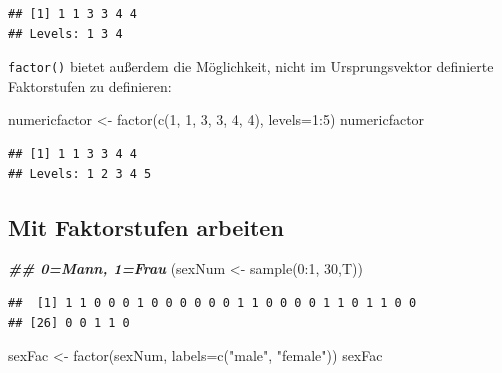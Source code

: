 \documentclass[
]{book}
\newenvironment{Shaded}{\begin{snugshade}}{\end{snugshade}}
\newcommand{\AttributeTok}[1]{\textcolor[rgb]{0.77,0.63,0.00}{#1}}
\newcommand{\DecValTok}[1]{\textcolor[rgb]{0.00,0.00,0.81}{#1}}
\newcommand{\DocumentationTok}[1]{\textcolor[rgb]{0.56,0.35,0.01}{\textbf{\textit{#1}}}}
\newcommand{\FunctionTok}[1]{\textcolor[rgb]{0.00,0.00,0.00}{#1}}
\newcommand{\NormalTok}[1]{#1}
\newcommand{\OtherTok}[1]{\textcolor[rgb]{0.56,0.35,0.01}{#1}}
\newcommand{\SpecialCharTok}[1]{\textcolor[rgb]{0.00,0.00,0.00}{#1}}
\newcommand{\StringTok}[1]{\textcolor[rgb]{0.31,0.60,0.02}{#1}}
\begin{document}
\begin{verbatim}
## [1] 1 1 3 3 4 4
## Levels: 1 3 4
\end{verbatim}

\texttt{factor()} bietet außerdem die Möglichkeit, nicht im Ursprungsvektor definierte Faktorstufen zu definieren:

\begin{Shaded}
\begin{Highlighting}[]
\NormalTok{numericfactor }\OtherTok{\textless{}{-}} \FunctionTok{factor}\NormalTok{(}\FunctionTok{c}\NormalTok{(}\DecValTok{1}\NormalTok{, }\DecValTok{1}\NormalTok{, }\DecValTok{3}\NormalTok{, }\DecValTok{3}\NormalTok{, }\DecValTok{4}\NormalTok{, }\DecValTok{4}\NormalTok{), }\AttributeTok{levels=}\DecValTok{1}\SpecialCharTok{:}\DecValTok{5}\NormalTok{)}
\NormalTok{numericfactor}
\end{Highlighting}
\end{Shaded}

\begin{verbatim}
## [1] 1 1 3 3 4 4
## Levels: 1 2 3 4 5
\end{verbatim}

\hypertarget{mit-faktorstufen-arbeiten}{%
\subsection{Mit Faktorstufen arbeiten}\label{mit-faktorstufen-arbeiten}}

\begin{Shaded}
\begin{Highlighting}[]
\DocumentationTok{\#\# 0=Mann, 1=Frau}
\NormalTok{(sexNum }\OtherTok{\textless{}{-}} \FunctionTok{sample}\NormalTok{(}\DecValTok{0}\SpecialCharTok{:}\DecValTok{1}\NormalTok{, }\DecValTok{30}\NormalTok{,T)) }
\end{Highlighting}
\end{Shaded}

\begin{verbatim}
##  [1] 1 1 0 0 0 1 0 0 0 0 0 0 1 1 0 0 0 0 1 1 0 1 1 0 0
## [26] 0 0 1 1 0
\end{verbatim}

\begin{Shaded}
\begin{Highlighting}[]
\NormalTok{sexFac }\OtherTok{\textless{}{-}} \FunctionTok{factor}\NormalTok{(sexNum, }\AttributeTok{labels=}\FunctionTok{c}\NormalTok{(}\StringTok{"male"}\NormalTok{, }\StringTok{"female"}\NormalTok{))}
\NormalTok{sexFac}
\end{Highlighting}
\end{Shaded}
\end{document}
